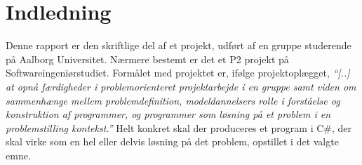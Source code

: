 \chapter{Indledning}\label{chap:indledning}



Denne rapport er den skriftlige del af et projekt, udført af en gruppe studerende på Aalborg Universitet.
Nærmere bestemt er det et P2 projekt på Softwareingeniørstudiet. Formålet med projektet er, ifølge
projektoplægget, \textit{``[..] at opnå færdigheder i problemorienteret projektarbejde i en gruppe samt viden
om sammenhænge mellem problemdefinition, modeldannelsers rolle i forståelse og konstruktion af programmer, og
programmer som løsning på et problem i en problemstilling kontekst.''} \citep{projektkatalog} Helt konkret skal der produceres et program i
C\#, der skal virke som en hel eller delvis løsning
på det problem, opstillet i det valgte emne.


